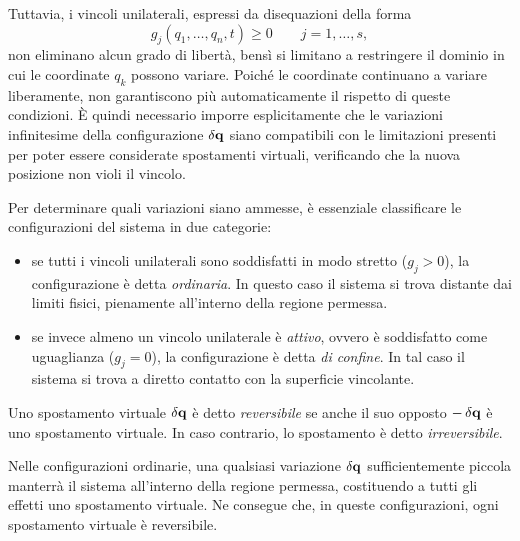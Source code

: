 Tuttavia, i vincoli unilaterali, espressi da disequazioni della forma
\begin{equation*}
    g_j(q_1, \dots, q_n, t) \geq 0 \qquad j = 1, \dots, s,
\end{equation*}
non eliminano alcun grado di libertà, bensì si limitano a restringere il dominio in cui le coordinate $q_k$ possono variare. Poiché le coordinate continuano a variare liberamente, non garantiscono più automaticamente il rispetto di queste condizioni. È quindi necessario imporre esplicitamente che le variazioni infinitesime della configurazione $\var{\vb{q}}$ siano compatibili con le limitazioni presenti per poter essere considerate spostamenti virtuali, verificando che la nuova posizione non violi il vincolo.

Per determinare quali variazioni siano ammesse, è essenziale classificare le configurazioni del sistema in due categorie:
\begin{itemize}
    \item se tutti i vincoli unilaterali sono soddisfatti in modo stretto ($g_j > 0$), la configurazione è detta \emph{ordinaria}. In questo caso il sistema si trova distante dai limiti fisici, pienamente all'interno della regione permessa.
    \item se invece almeno un vincolo unilaterale è \emph{attivo}, ovvero è soddisfatto come uguaglianza ($g_j = 0$), la configurazione è detta \emph{di confine}. In tal caso il sistema si trova a diretto contatto con la superficie vincolante.
\end{itemize}

\begin{definition}
    Uno spostamento virtuale $\var{\vb{q}}$ è detto \emph{reversibile} se anche il suo opposto $-\var{\vb{q}}$ è uno spostamento virtuale. In caso contrario, lo spostamento è detto \emph{irreversibile}.
\end{definition}

Nelle configurazioni ordinarie, una qualsiasi variazione $\var{\vb{q}}$ sufficientemente piccola manterrà il sistema all'interno della regione permessa, costituendo a tutti gli effetti uno spostamento virtuale. Ne consegue che, in queste configurazioni, ogni spostamento virtuale è reversibile.


